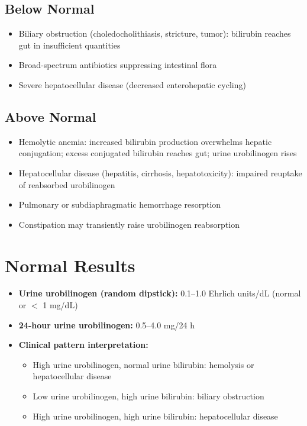 \subsection*{Below Normal}
\begin{itemize}
  \item Biliary obstruction (choledocholithiasis, stricture, tumor): bilirubin reaches gut in insufficient quantities
  \item Broad-spectrum antibiotics suppressing intestinal flora
  \item Severe hepatocellular disease (decreased enterohepatic cycling)
\end{itemize}

\subsection*{Above Normal}
\begin{itemize}
  \item Hemolytic anemia: increased bilirubin production overwhelms hepatic conjugation; excess conjugated bilirubin reaches gut; urine urobilinogen rises
  \item Hepatocellular disease (hepatitis, cirrhosis, hepatotoxicity): impaired reuptake of reabsorbed urobilinogen
  \item Pulmonary or subdiaphragmatic hemorrhage resorption
  \item Constipation may transiently raise urobilinogen reabsorption
\end{itemize}

\section*{Normal Results}
\begin{itemize}
  \item \textbf{Urine urobilinogen (random dipstick):} 0.1--1.0 Ehrlich units/dL (normal or $<$ 1 mg/dL)
  \item \textbf{24-hour urine urobilinogen:} 0.5--4.0 mg/24 h
  \item \textbf{Clinical pattern interpretation:}
    \begin{itemize}
      \item High urine urobilinogen, normal urine bilirubin: hemolysis or hepatocellular disease
      \item Low urine urobilinogen, high urine bilirubin: biliary obstruction
      \item High urine urobilinogen, high urine bilirubin: hepatocellular disease
    \end{itemize}
\end{itemize}

